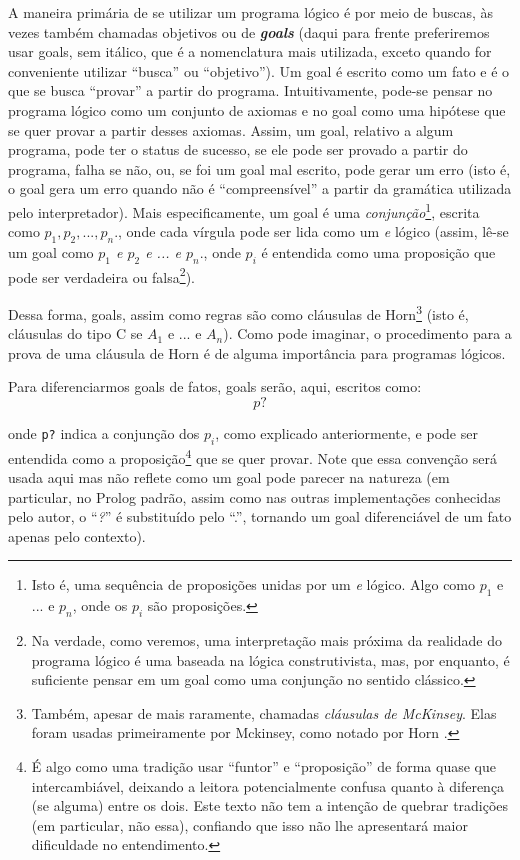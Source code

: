 \documentclass{article}
\theoremstyle{remark}
\begin{document}
A maneira primária de se utilizar um programa lógico é por meio de buscas, às vezes também chamadas objetivos ou de \textbf{\textit{goals}} (daqui para frente preferiremos usar goals, sem itálico, que é a nomenclatura mais utilizada, exceto quando for conveniente utilizar ``busca'' ou ``objetivo''). Um goal é escrito como um fato e é o que se busca ``provar'' a partir do programa. Intuitivamente, pode-se pensar no programa lógico como um conjunto de axiomas e no goal como uma hipótese que se quer provar a partir desses axiomas. Assim, um
goal, relativo a algum programa, pode ter o status de sucesso, se ele pode ser provado a partir do programa, falha se não, ou, se foi um goal mal escrito, pode gerar um erro (isto é, o goal gera um erro quando não é ``compreensível'' a partir da gramática utilizada pelo interpretador). Mais especificamente, um goal é uma \textit{conjunção}\footnote{Isto é, uma sequência de proposições unidas por um \textit{e} lógico. Algo como $p_1$ e
  ... e $p_n$, onde os $p_i$ são proposições.}, escrita como \textit{$p_1,p_2,...,p_n.$}, onde cada vírgula pode ser lida como um \textit{e} lógico (assim, lê-se um goal como \textit{$p_1$ e $p_2$ e ... e
  $p_n.$}, onde $p_i$ é
entendida como uma proposição que pode ser verdadeira ou falsa\footnote{Na verdade, como veremos, uma interpretação mais próxima da realidade do programa lógico é uma baseada na lógica construtivista, mas, por enquanto, é suficiente pensar em um goal como uma conjunção no sentido clássico.}).

Dessa forma, goals, assim como regras são como cláusulas de Horn\footnote{Também, apesar de mais raramente, chamadas \textit{cláusulas de McKinsey}. Elas foram usadas primeiramente por Mckinsey, como notado por Horn \cite{horn}.} (isto é, cláusulas do tipo C se $A_1$ e ... e $A_n$). Como pode imaginar, o procedimento para a prova de uma cláusula de Horn é de alguma importância para programas lógicos.

Para diferenciarmos goals de fatos, goals serão, aqui, escritos como:
\[
  p?
\]

\noindent onde {\tt p?} indica a conjunção dos $p_i$, como explicado anteriormente, e pode ser entendida como a proposição\footnote{É algo como uma tradição usar ``funtor'' e ``proposição'' de forma quase que intercambiável, deixando a leitora potencialmente confusa quanto à diferença (se alguma) entre os dois. Este texto não tem a intenção de quebrar tradições (em particular, não essa), confiando que isso não lhe apresentará maior dificuldade no entendimento.} que se quer provar. Note que essa convenção será usada aqui mas não reflete como um goal pode parecer na natureza (em particular, no
Prolog padrão, assim como nas outras implementações conhecidas pelo autor, o ``\textit{?}'' é substituído pelo ``.'', tornando um goal diferenciável de um fato apenas pelo contexto).
\end{document}
